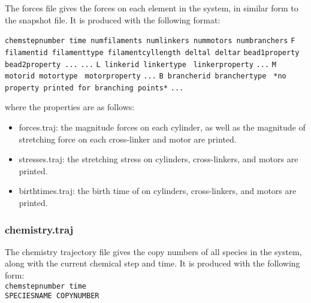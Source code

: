 \documentclass[11pt, oneside]{article}   	%
\begin{document}
The forces file gives the forces on each element in the system, in similar form to the snapshot file. It is produced with the following format:\newline

\noindent\texttt{chemstepnumber time numfilaments numlinkers nummotors numbranchers}\newline
\texttt{F filamentid filamenttype filamentcyllength deltal deltar}\newline
\texttt{bead1property bead2property ...}\newline
\texttt{...}\newline
\texttt{L linkerid linkertype }\newline
\texttt{linkerproperty}\newline
\texttt{...}\newline
\texttt{M motorid motortype }\newline
\texttt{motorproperty}\newline
\texttt{...}\newline
\texttt{B brancherid branchertype }\newline
\texttt{*no property printed for branching points*}\newline
\texttt{...}\newline

\noindent where the properties are as follows:
\begin{itemize}
\item forces.traj: the magnitude forces on each cylinder, as well as the magnitude of stretching force on each cross-linker and motor are printed.
\item stresses.traj: the stretching stress on cylinders, cross-linkers, and motors are printed.
\item birthtimes.traj: the birth time of on cylinders, cross-linkers, and motors are printed.

\end{itemize}

\subsubsection{chemistry.traj}
The chemistry trajectory file gives the copy numbers of all species in the system, along with the current chemical step and time. It is produced with the following form:\\

\noindent\texttt{chemstepnumber time}\\
\texttt{SPECIESNAME COPYNUMBER}\\
\end{document}
